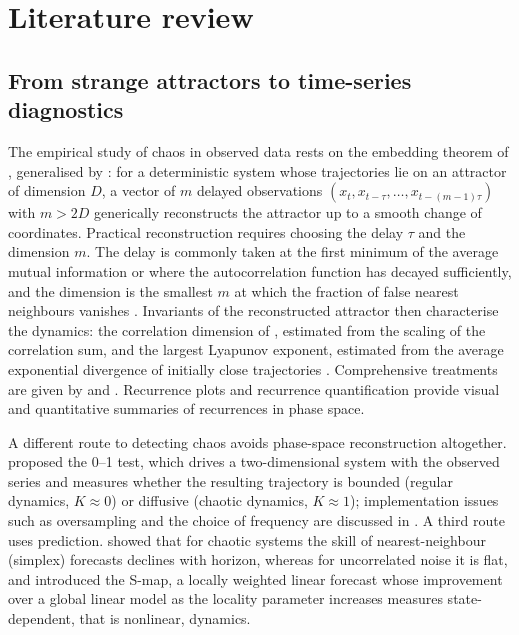 \documentclass[11pt,a4paper]{article}
\begin{document}
\section{Literature review}\label{sec:lit}

\subsection{From strange attractors to time-series diagnostics}

The empirical study of chaos in observed data rests on the embedding theorem of \citet{Takens1981}, generalised
by \citet{Sauer1991}: for a deterministic system whose trajectories lie on an attractor of dimension $D$, a vector
of $m$ delayed observations $(x_t, x_{t-\tau},\dots,x_{t-(m-1)\tau})$ with $m > 2D$ generically reconstructs the
attractor up to a smooth change of coordinates. Practical reconstruction requires choosing the delay $\tau$ and
the dimension $m$. The delay is commonly taken at the first minimum of the average mutual information
\citep{FraserSwinney1986} or where the autocorrelation function has decayed sufficiently, and the dimension is the
smallest $m$ at which the fraction of false nearest neighbours vanishes \citep{Kennel1992}. Invariants of the
reconstructed attractor then characterise the dynamics: the correlation dimension of \citet{GrassbergerProcaccia1983},
estimated from the scaling of the correlation sum, and the largest Lyapunov exponent, estimated from the average
exponential divergence of initially close trajectories \citep{Wolf1985,Rosenstein1993}. Comprehensive treatments
are given by \citet{EckmannRuelle1985} and \citet{KantzSchreiber2004}. Recurrence plots
\citep{Eckmann1987} and recurrence quantification \citep{Marwan2007} provide visual and quantitative summaries of
recurrences in phase space.

A different route to detecting chaos avoids phase-space reconstruction altogether. \citet{GottwaldMelbourne2004}
proposed the 0--1 test, which drives a two-dimensional system with the observed series and measures whether the
resulting trajectory is bounded (regular dynamics, $K \approx 0$) or diffusive (chaotic dynamics, $K\approx 1$);
implementation issues such as oversampling and the choice of frequency are discussed in
\citet{GottwaldMelbourne2009}. A third route uses prediction. \citet{SugiharaMay1990} showed that for chaotic
systems the skill of nearest-neighbour (simplex) forecasts declines with horizon, whereas for uncorrelated noise it
is flat, and \citet{Sugihara1994} introduced the S-map, a locally weighted linear forecast whose improvement over a
global linear model as the locality parameter increases measures state-dependent, that is nonlinear, dynamics.
\end{document}
